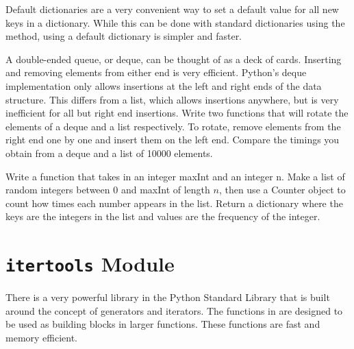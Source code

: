 Default dictionaries are a very convenient way to set a default value for all new keys in a dictionary.
While this can be done with standard dictionaries using the  method, using a default dictionary is simpler and faster.

\begin{problem}
A double-ended queue, or deque, can be thought of as a deck of cards.
Inserting and removing elements from either end is very efficient.
Python's deque implementation only allows insertions at the left and right ends of the data structure.
This differs from a list, which allows insertions anywhere, but is very inefficient for all but right end insertions.
Write two functions that will rotate the elements of a deque and a list respectively.
To rotate, remove elements from the right end one by one and insert them on the left end.
Compare the timings you obtain from a deque and a list of 10000 elements.
\end{problem}

\begin{problem}
Write a function that takes in an integer maxInt and an integer n.
Make a list of random integers between 0 and maxInt of length $n$, then use a Counter object to count how times each number appears in the list.
Return a dictionary where the keys are the integers in the list and values are the frequency of the integer.
\end{problem}

\section*{\texttt{itertools} Module}
There is a very powerful library in the Python Standard Library that is built around the concept
of generators and iterators.  The functions in  are designed to be used as
building blocks in larger functions.  These functions are fast and memory efficient.

